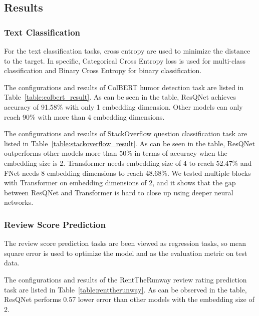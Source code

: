 \subsection{Results}

\subsubsection{Text Classification}
For the text classification tasks, cross entropy are used to minimize the distance to the target. In specific, Categorical Cross Entropy loss is used for multi-class classification and Binary Cross Entropy for binary classification.

The configurations and results of ColBERT humor detection task are listed in Table~\ref{table:colbert_result}. As can be seen in the table, ResQNet achieves accuracy of 91.58\% with only 1 embedding dimension. Other models can only reach 90\% with more than 4 embedding dimensions.

The configurations and results of StackOverflow question classification task are listed in Table~\ref{table:stackoverflow_result}. As can be seen in the table, ResQNet outperforms other models more than 50\% in terms of accuracy when the embedding size is 2. Transformer needs embedding size of 4 to reach 52.47\% and FNet needs 8 embedding dimensions to reach 48.68\%. We tested multiple blocks with Transformer on embedding dimensions of 2, and it shows that the gap between ResQNet and Transformer is hard to close up using deeper neural networks.

\subsubsection{Review Score Prediction}
The review score prediction tasks are been viewed as regression tasks, so mean square error is used to optimize the model and as the evaluation metric on test data.

The configurations and results of the RentTheRunway review rating prediction task are listed in Table~\ref{table:renttherunway}. As can be observed in the table, ResQNet performs 0.57 lower error than other models with the embedding size of 2. 
